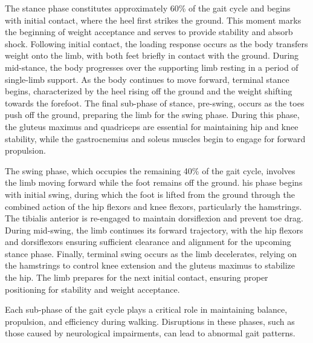 The stance phase constitutes approximately 60\% of the gait cycle and begins with initial contact, where the heel first strikes the ground. This moment marks the beginning of weight acceptance and serves to provide stability and absorb shock. Following initial contact, the loading response occurs as the body transfers weight onto the limb, with both feet briefly in contact with the ground. During mid-stance, the body progresses over the supporting limb resting in a period of single-limb support. As the body continues to move forward, terminal stance begins, characterized by the heel rising off the ground and the weight shifting towards the forefoot. The final sub-phase of stance, pre-swing, occurs as the toes push off the ground, preparing the limb for the swing phase. During this phase, the gluteus maximus and quadriceps are essential for maintaining hip and knee stability, while the gastrocnemius and soleus muscles begin to engage for forward propulsion.

The swing phase, which occupies the remaining 40\% of the gait cycle, involves the limb moving forward while the foot remains off the ground. his phase begins with initial swing, during which the foot is lifted from the ground through the combined action of the hip flexors and knee flexors, particularly the hamstrings. The tibialis anterior is re-engaged to maintain dorsiflexion and prevent toe drag. During mid-swing, the limb continues its forward trajectory, with the hip flexors and dorsiflexors ensuring sufficient clearance and alignment for the upcoming stance phase. Finally, terminal swing occurs as the limb decelerates, relying on the hamstrings to control knee extension and the gluteus maximus to stabilize the hip. The limb prepares for the next initial contact, ensuring proper positioning for stability and weight acceptance.

Each sub-phase of the gait cycle plays a critical role in maintaining balance, propulsion, and efficiency during walking. Disruptions in these phases, such as those caused by neurological impairments, can lead to abnormal gait patterns.






